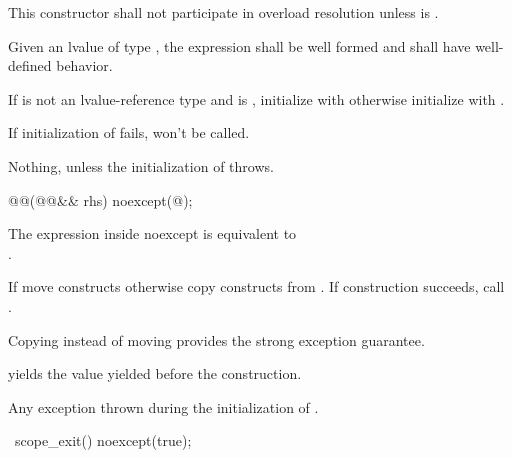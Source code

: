 \documentclass[ebook,11pt,article]{memoir}
\begin{document}
\begin{itemdescr}
\pnum
\remarks This constructor shall not participate in overload resolution unless  is .

\pnum
\requires Given an lvalue  of type , the expression  shall be well formed and shall have well-defined behavior.

\pnum
\effects If  is not an lvalue-reference type and  is , initialize   with  otherwise initialize  with . 
\begin{note}
If initialization of  fails,  won't be called.
\end{note}

\pnum
\throws Nothing, unless the initialization of  throws.
\end{itemdescr}

\begin{itemdecl}
@@(@@&& rhs) noexcept(@\seebelow@);
\end{itemdecl}

\begin{itemdescr}
\pnum
\remarks
The expression inside noexcept is equivalent to \\
.

\pnum
\effects %
If  move constructs otherwise copy constructs  from . If construction succeeds, call .
\begin{note}
Copying instead of moving provides the strong exception guarantee.
\end{note}


\pnum
\postconditions
{} yields the value  yielded before the construction.

\pnum
\throws Any exception thrown during the initialization of .

\end{itemdescr}

\begin{itemdecl}
~scope_exit() noexcept(true);
\end{itemdecl}
\end{document}
